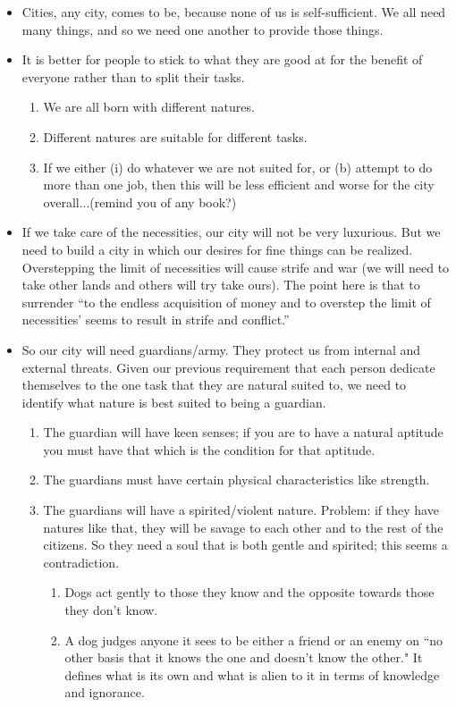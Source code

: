 \documentclass[oneside]{article}
\begin{document}
\begin{itemize}
\item Cities, any city, comes to be, because none of us is self-sufficient. We all need many things, and so we need one another to provide those things. 
\item It is better for people to stick to what they are good at for the benefit of everyone rather than to split their tasks.
\begin{enumerate}
\item  We are all born with different natures.
\item Different natures are suitable for different tasks. 
\item If we either (i) do whatever we are not suited for, or (b) attempt to do more than one job, then this will be less efficient and worse for the city overall...(remind you of any book?)
\end{enumerate}
\item If we take care of the necessities, our city will not be very luxurious. But we need to build a city in which our desires for fine things can be realized. Overstepping the limit of necessities will cause strife and war (we will need to take other lands and others will try take ours). The point here is that to surrender ``to the endless acquisition of money and to overstep the limit of necessities' seems to result in strife and conflict.'' 
\item So our city will need guardians/army. They protect us from internal and external threats. Given our previous requirement that each person dedicate themselves to the one task that they are natural suited to, we need to identify what nature is best suited to being a guardian. 
\begin{enumerate}
\item The guardian will have keen senses; if you are to have a natural aptitude you must have that which is the condition for that aptitude. 
\item The guardians must have certain physical characteristics
 like strength. 
\item The guardians will have a spirited/violent nature. Problem: if they have natures like that, they will be savage to each other and to the rest of the citizens. So they need a soul that is both gentle and spirited; this seems  a contradiction. 
\begin{enumerate}
\item Dogs act gently to those they know and the opposite towards those they don't know. 
\item A dog judges anyone it sees to be either a friend or an enemy on ``no other basis that it knows the one and doesn't know the other." It defines what is its own and what is alien to it in terms of knowledge and ignorance.

\end{enumerate}
\end{enumerate}
\end{itemize}
\end{document}
